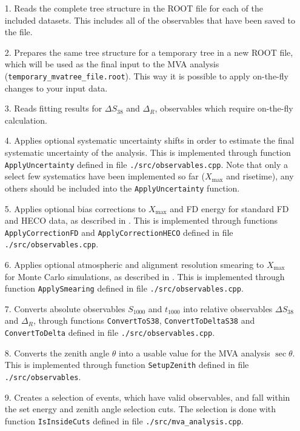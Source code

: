 \documentclass[12pt,a4paper]{report}
\begin{document}
\begin{itemize}
\item[1.] Reads the complete tree structure in the ROOT file for each of the included datasets. This includes all of the observables that have been saved to the file.
\item[2.] Prepares the same tree structure for a temporary tree in a new ROOT file, which will be used as the final input to the MVA analysis (\texttt{temporary\_mvatree\_file.root}). This way it is possible to apply on-the-fly changes to your input data.
\item[3.] Reads fitting results for $\Delta S_{38}$ and $\Delta_R$, observables which require on-the-fly calculation.
\item[4.] Applies optional systematic uncertainty shifts in order to estimate the final systematic uncertainty of the analysis. This is implemented through function \texttt{ApplyUncertainty} defined in file \texttt{./src/observables.cpp}. Note that only a select few systematics have been implemented so far ($X_{\textrm{max}}$ and risetime), any others should be included into the \texttt{ApplyUncertainty} function.
\item[5.] Applies optional bias corrections to $X_{\textrm{max}}$ and FD energy for standard FD and HECO data, as described in \cite{CompositionAugerWiki}. This is implemented through functions \texttt{ApplyCorrectionFD} and \texttt{ApplyCorrectionHECO} defined in file \texttt{./src/observables.cpp}.
\item[6.] Applies optional atmospheric and alignment resolution smearing to $X_{\textrm{max}}$ for Monte Carlo simulations, as described in \cite{xmaxMoments,xmaxUnger}. This is implemented through function \texttt{ApplySmearing} defined in file \texttt{./src/observables.cpp}.
\item[7.] Converts absolute observables $S_{1000}$ and $t_{1000}$ into relative observables $\Delta S_{38}$ and $\Delta_R$, through functions \texttt{ConvertToS38}, \texttt{ConvertToDeltaS38} and \texttt{ConvertToDelta} defined in file \texttt{./src/observables.cpp}.
\item[8.] Converts the zenith angle $\theta$ into a usable value for the MVA analysis $\sec \theta$. This is implemented through function \texttt{SetupZenith} defined in file \texttt{./src/observables}.
\item[9.] Creates a selection of events, which have valid observables, and fall within the set energy and zenith angle selection cuts. The selection is done with function \texttt{IsInsideCuts} defined in file \texttt{./src/mva\_analysis.cpp}.
\end{itemize}
\end{document}
